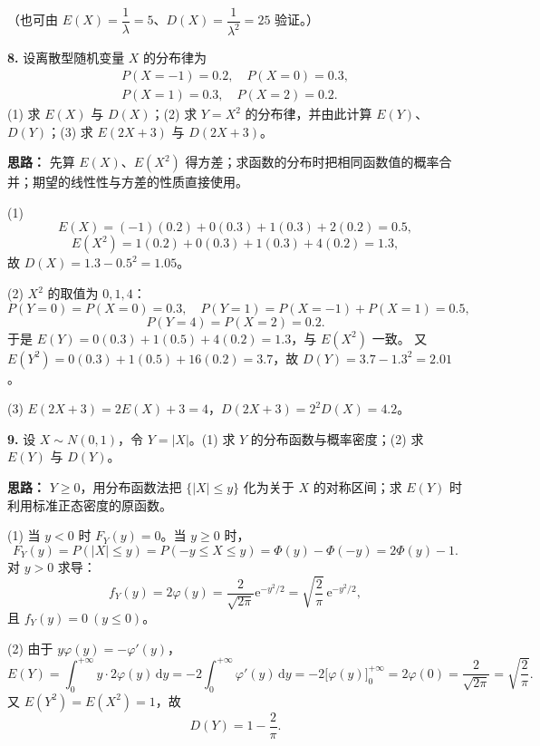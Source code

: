 （也可由 $E(X)=\dfrac1\lambda=5$、$D(X)=\dfrac1{\lambda^2}=25$ 验证。）

\else \answerarea[8] \fi%

\textbf{8.} 设离散型随机变量 $X$ 的分布律为
\[
\begin{gathered}
P(X=-1)=0.2,\quad P(X=0)=0.3,\\
P(X=1)=0.3,\quad P(X=2)=0.2.
\end{gathered}
\]
(1) 求 $E(X)$ 与 $D(X)$；(2) 求 $Y=X^2$ 的分布律，并由此计算 $E(Y)$、$D(Y)$；(3) 求 $E(2X+3)$ 与 $D(2X+3)$。

\ifshowsolutions%
\textbf{思路：} 先算 $E(X)$、$E(X^2)$ 得方差；求函数的分布时把相同函数值的概率合并；期望的线性性与方差的性质直接使用。

(1)
\[
E(X)=(-1)(0.2)+0(0.3)+1(0.3)+2(0.2)=0.5,
\]
\[
E(X^2)=1(0.2)+0(0.3)+1(0.3)+4(0.2)=1.3,
\]
故 $D(X)=1.3-0.5^2=1.05$。

(2) $X^2$ 的取值为 $0,1,4$：
\[
P(Y=0)=P(X=0)=0.3,\quad P(Y=1)=P(X=-1)+P(X=1)=0.5,
\]
\[
P(Y=4)=P(X=2)=0.2.
\]
于是 $E(Y)=0(0.3)+1(0.5)+4(0.2)=1.3$，与 $E(X^2)$ 一致。
又 $E(Y^2)=0(0.3)+1(0.5)+16(0.2)=3.7$，故 $D(Y)=3.7-1.3^2=2.01$。

(3) $E(2X+3)=2E(X)+3=4$，$D(2X+3)=2^2D(X)=4.2$。

\else \answerarea[8] \fi%

\textbf{9.} 设 $X\sim N(0,1)$，令 $Y=|X|$。(1) 求 $Y$ 的分布函数与概率密度；(2) 求 $E(Y)$ 与 $D(Y)$。

\ifshowsolutions%
\textbf{思路：} $Y\geq0$，用分布函数法把 $\{|X|\leq y\}$ 化为关于 $X$ 的对称区间；求 $E(Y)$ 时利用标准正态密度的原函数。

(1) 当 $y<0$ 时 $F_Y(y)=0$。当 $y\geq0$ 时，
\[
F_Y(y)=P(|X|\leq y)=P(-y\leq X\leq y)=\Phi(y)-\Phi(-y)=2\Phi(y)-1.
\]
对 $y>0$ 求导：
\[
f_Y(y)=2\varphi(y)=\frac{2}{\sqrt{2\pi}}\mathrm{e}^{-y^2/2}
=\sqrt{\frac{2}{\pi}}\,\mathrm{e}^{-y^2/2},
\]
且 $f_Y(y)=0\ (y\leq0)$。

(2) 由于 $y\varphi(y)=-\varphi'(y)$，
\[
E(Y)=\int_0^{+\infty}y\cdot2\varphi(y)\,\mathrm{d}y
=-2\int_0^{+\infty}\varphi'(y)\,\mathrm{d}y
=-2\bigl[\varphi(y)\bigr]_0^{+\infty}
=2\varphi(0)=\frac{2}{\sqrt{2\pi}}=\sqrt{\frac{2}{\pi}}.
\]
又 $E(Y^2)=E(X^2)=1$，故
\[
D(Y)=1-\frac{2}{\pi}.
\]

